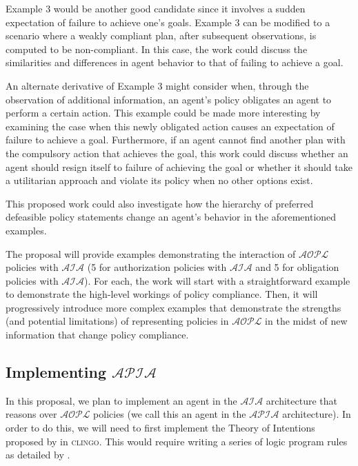 Example 3 would be another good candidate since it involves a sudden expectation of failure to achieve one's goals.
Example 3 can be modified to a scenario where a weakly compliant plan, after subsequent observations, is computed to be non-compliant.
In this case, the work could discuss the similarities and differences in agent behavior to that of failing to achieve a goal.

An alternate derivative of Example 3 might consider when, through the observation of additional information, an agent's policy obligates an agent to perform a certain action.
This example could be made more interesting by examining the case when this newly obligated action causes an expectation of failure to achieve a goal.
Furthermore, if an agent cannot find another plan with the compulsory action that achieves the goal, this work could discuss whether an agent should resign itself to failure of achieving the goal or whether it should take a utilitarian approach and violate its policy when no other options exist.

This proposed work could also investigate how the hierarchy of preferred defeasible policy statements change an agent's behavior in the aforementioned examples.

The proposal will provide examples demonstrating the interaction of $\mathcal{AOPL}$ policies with $\mathcal{AIA}$ (5 for authorization policies with $\mathcal{AIA}$ and 5 for obligation policies with $\mathcal{AIA}$).
For each, the work will start with a straightforward example to demonstrate the high-level workings of policy compliance.
Then, it will progressively introduce more complex examples that demonstrate the strengths (and potential limitations) of representing policies in $\mathcal{AOPL}$ in the midst of new information that change policy compliance.

\subsection{Implementing $\mathcal{APIA}$}

In this proposal, we plan to implement an agent in the $\mathcal{AIA}$ architecture that reasons over $\mathcal{AOPL}$ policies (we call this an agent in the $\mathcal{APIA}$ architecture).
In order to do this, we will need to first implement the Theory of Intentions proposed by \citet{blount_towards_2014} in \textsc{clingo}.
This would require writing a series of logic program rules as detailed by \citet{blount_towards_2014}.

